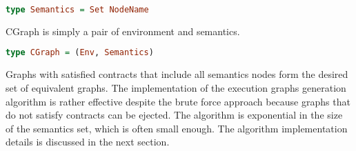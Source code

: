 \begin{lstlisting}[language=Haskell]
type Semantics = Set NodeName
\end{lstlisting}

CGraph is simply a pair of environment and semantics.

\begin{lstlisting}[language=Haskell]
type CGraph = (Env, Semantics)
\end{lstlisting}

Graphs with satisfied contracts that include all semantics nodes form the desired set of equivalent graphs. The implementation of the execution graphs generation algorithm is rather effective despite the brute force approach because graphs that do not satisfy contracts can be ejected. The algorithm is exponential in the size of the semantics set, which is often small enough. The algorithm implementation details is discussed in the next section.







